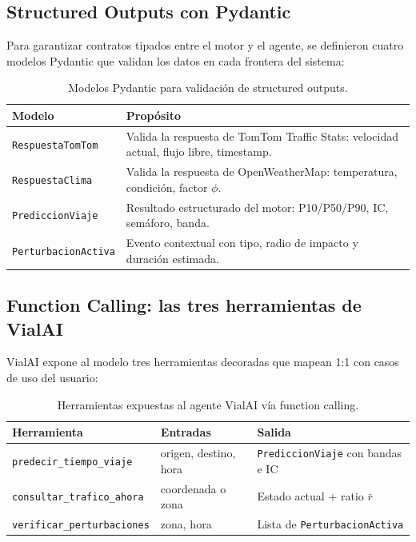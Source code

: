 \documentclass[11pt,a4paper]{article}
\begin{document}
\subsection{Structured Outputs con Pydantic}

Para garantizar contratos tipados entre el motor y el agente, se definieron cuatro modelos Pydantic que validan los datos en cada frontera del sistema:

\begin{table}[H]
\centering
\small
\begin{tabular}{@{}lp{9cm}@{}}
\toprule
\textbf{Modelo} & \textbf{Propósito} \\
\midrule
\texttt{RespuestaTomTom} & Valida la respuesta de TomTom Traffic Stats: velocidad actual, flujo libre, timestamp. \\
\texttt{RespuestaClima} & Valida la respuesta de OpenWeatherMap: temperatura, condición, factor $\phi$. \\
\texttt{PrediccionViaje} & Resultado estructurado del motor: P10/P50/P90, IC, semáforo, banda. \\
\texttt{PerturbacionActiva} & Evento contextual con tipo, radio de impacto y duración estimada. \\
\bottomrule
\end{tabular}
\caption{Modelos Pydantic para validación de structured outputs.}
\label{tab:pydantic}
\end{table}

\subsection{Function Calling: las tres herramientas de VialAI}

VialAI expone al modelo tres herramientas decoradas que mapean 1:1 con casos de uso del usuario:

\begin{table}[H]
\centering
\small
\begin{tabular}{@{}p{4cm}p{4.5cm}p{4.5cm}@{}}
\toprule
\textbf{Herramienta} & \textbf{Entradas} & \textbf{Salida} \\
\midrule
\texttt{predecir\_tiempo\_viaje} & origen, destino, hora & \texttt{PrediccionViaje} con bandas e IC \\
\texttt{consultar\_trafico\_ahora} & coordenada o zona & Estado actual + ratio $\bar{r}$ \\
\texttt{verificar\_perturbaciones} & zona, hora & Lista de \texttt{PerturbacionActiva} \\
\bottomrule
\end{tabular}
\caption{Herramientas expuestas al agente VialAI vía function calling.}
\label{tab:tools}
\end{table}
\end{document}
